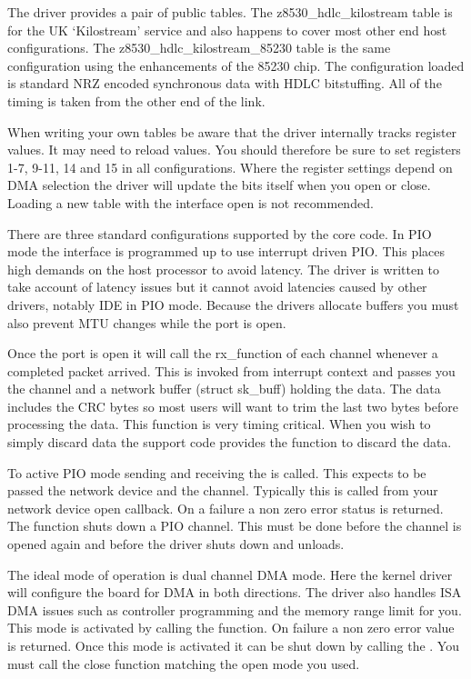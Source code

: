 \documentclass[a4paper,8pt,english]{sphinxmanual}
\begin{document}
The driver provides a pair of public tables. The z8530\_hdlc\_kilostream
table is for the UK `Kilostream' service and also happens to cover most
other end host configurations. The z8530\_hdlc\_kilostream\_85230 table
is the same configuration using the enhancements of the 85230 chip. The
configuration loaded is standard NRZ encoded synchronous data with HDLC
bitstuffing. All of the timing is taken from the other end of the link.

When writing your own tables be aware that the driver internally tracks
register values. It may need to reload values. You should therefore be
sure to set registers 1-7, 9-11, 14 and 15 in all configurations. Where
the register settings depend on DMA selection the driver will update the
bits itself when you open or close. Loading a new table with the
interface open is not recommended.

There are three standard configurations supported by the core code. In
PIO mode the interface is programmed up to use interrupt driven PIO.
This places high demands on the host processor to avoid latency. The
driver is written to take account of latency issues but it cannot avoid
latencies caused by other drivers, notably IDE in PIO mode. Because the
drivers allocate buffers you must also prevent MTU changes while the
port is open.

Once the port is open it will call the rx\_function of each channel
whenever a completed packet arrived. This is invoked from interrupt
context and passes you the channel and a network buffer (struct
sk\_buff) holding the data. The data includes the CRC bytes so most
users will want to trim the last two bytes before processing the data.
This function is very timing critical. When you wish to simply discard
data the support code provides the function
{\hyperref[networking/z8530book:c.z8530_null_rx]{\emph{}}} to discard the data.

To active PIO mode sending and receiving the  is called.
This expects to be passed the network device and the channel. Typically
this is called from your network device open callback. On a failure a
non zero error status is returned.
The {\hyperref[networking/z8530book:c.z8530_sync_close]{\emph{}}} function shuts down a PIO
channel. This must be done before the channel is opened again and before
the driver shuts down and unloads.

The ideal mode of operation is dual channel DMA mode. Here the kernel
driver will configure the board for DMA in both directions. The driver
also handles ISA DMA issues such as controller programming and the
memory range limit for you. This mode is activated by calling the
{\hyperref[networking/z8530book:c.z8530_sync_dma_open]{\emph{}}} function. On failure a non zero
error value is returned. Once this mode is activated it can be shut down
by calling the {\hyperref[networking/z8530book:c.z8530_sync_dma_close]{\emph{}}}. You must call
the close function matching the open mode you used.
\end{document}
